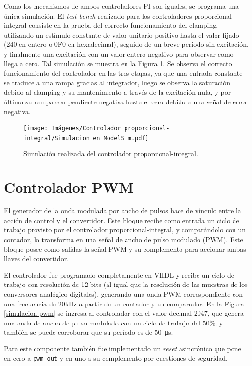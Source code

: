 Como los mecanismos de ambos controladores PI son iguales, se programa una única simulación. El \emph{test bench} realizado para los controladores proporcional-integral consiste en la prueba del correcto funcionamiento del clamping, utilizando un estímulo constante de valor unitario positivo hasta el valor fijado (240 en entero o 0F0 en hexadecimal), seguido de un breve período sin excitación, y finalmente una excitación con un valor entero negativo para observar como llega a cero. Tal simulación se muestra en la Figura \ref{simulacion-pi}. Se observa el correcto funcionamiento del controlador en las tres etapas, ya que una entrada constante se traduce a una rampa gracias al integrador, luego se observa la saturación debido al clamping y su mantenimiento a través de la excitación nula, y por último su rampa con pendiente negativa hasta el cero debido a una señal de error negativa.

\begin{figure}[hbt!]
    \centering
    \texttt{[image: Imágenes/Controlador proporcional-integral/Simulacion en ModelSim.pdf]}    
    \caption{Simulación realizada del controlador proporcional-integral.}
    \label{simulacion-pi}
\end{figure} 

\section{Controlador PWM}

El generador de la onda modulada por ancho de pulsos hace de vínculo entre la acción de control y el convertidor. Este bloque recibe como entrada un ciclo de trabajo provisto por el controlador proporcional-integral, y comparándolo con un contador, lo transforma en una señal de ancho de pulso modulado (PWM). Este bloque posee como salidas la señal PWM y su complemento para accionar ambas llaves del convertidor.

El controlador fue programado completamente en VHDL y recibe un ciclo de trabajo con resolución de 12 bits (al igual que la resolución de las muestras de los conversores analógico-digitales), generando una onda PWM correspondiente con una frecuencia de 20kHz a partir de un contador y un comparador. En la Figura \ref{simulacion-pwm} se ingresa al controlador con el valor decimal 2047, que genera una onda de ancho de pulso modulado con un ciclo de trabajo del 50\%, y también se puede corroborar que su período es de \SI{50}{\micro\second}.

Para este componente también fue implementado un \emph{reset} asincrónico que pone en cero a \texttt{pwm\_out} y en uno a su complemento por cuestiones de seguridad.


